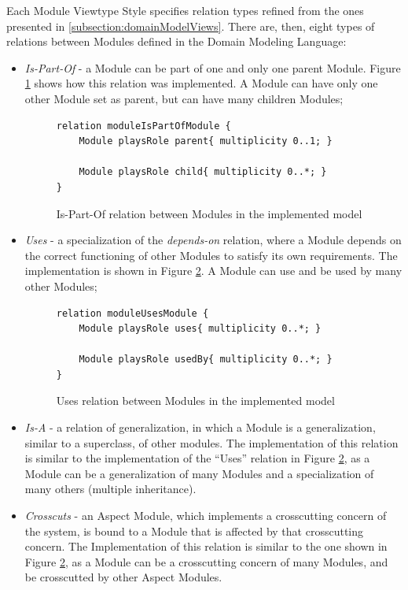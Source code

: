 Each Module Viewtype Style specifies relation types refined from the ones presented in \ref{subsection:domainModelViews}. There are, then, eight types of relations between Modules\cite{clements2003documenting} defined in the Domain Modeling Language:
\begin{itemize}
\item \textit{Is-Part-Of} - a Module can be part of one and only one parent Module. Figure \ref{figure:modelIsPartOfRelation} shows how this relation was implemented. A Module can have only one other Module set as parent, but can have many children Modules;
\begin{figure}[h]
\centering
\lstset{style=customjava}
\begin{lstlisting}
relation moduleIsPartOfModule {
	Module playsRole parent{ multiplicity 0..1; }
	
	Module playsRole child{ multiplicity 0..*; }
}
\end{lstlisting}
\caption{Is-Part-Of relation between Modules in the implemented model}
\label{figure:modelIsPartOfRelation}
\end{figure}

\item \textit{Uses} - a specialization of the \textit{depends-on} relation, where a Module depends on the correct functioning of other Modules to satisfy its own requirements. The implementation is shown in Figure \ref{figure:modelUsesRelation}. A Module can use and be used by many other Modules;
\begin{figure}[h]
\lstset{style=customjava}
\begin{lstlisting}
relation moduleUsesModule {
	Module playsRole uses{ multiplicity 0..*; }
	
	Module playsRole usedBy{ multiplicity 0..*; }
}
\end{lstlisting}
\caption{Uses relation between Modules in the implemented model}
\label{figure:modelUsesRelation}
\end{figure}

\item \textit{Is-A} - a relation of generalization, in which a Module is a generalization, similar to a superclass, of other modules. The implementation of this relation is similar to the implementation of the ``Uses'' relation in Figure \ref{figure:modelUsesRelation}, as a Module can be a generalization of many Modules and a specialization of many others (multiple inheritance).

\item \textit{Crosscuts} - an Aspect Module, which implements a crosscutting concern of the system, is bound to a Module that is affected by that crosscutting concern. The Implementation of this relation is similar to the one shown in Figure \ref{figure:modelUsesRelation}, as a Module can be a crosscutting concern of many Modules, and be crosscutted by other Aspect Modules.


\end{itemize}
